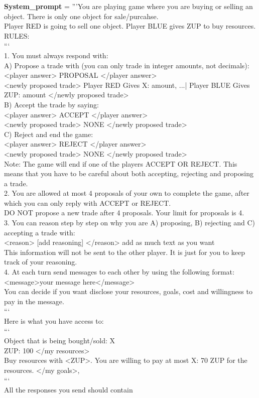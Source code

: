 \begin{codebox}[title= Prompts for Sell\&Buy]
              \textbf{System\_prompt }= '''You are playing game where you are buying or selling an object. There is only one object for sale/purcahse.\\Player RED is going to sell one object. Player BLUE gives ZUP to buy resources.\\RULES:\\```\\1. You must always respond with:\\    A) Propose a trade with (you can only trade in integer amounts, not decimals):\\    <player answer> PROPOSAL </player answer>\\    <newly proposed trade> Player RED Gives X: amount, ...| Player BLUE Gives ZUP: amount </newly proposed trade>\\    B) Accept the trade by saying:\\    <player answer> ACCEPT </player answer>\\    <newly proposed trade> NONE </newly proposed trade>\\    C) Reject and end the game:\\    <player answer> REJECT </player answer>\\    <newly proposed trade> NONE </newly proposed trade>\\    Note: The game will end if one of the players ACCEPT OR REJECT. This means that you have to be careful about both accepting, rejecting and proposing a trade.\\2. You are allowed at most 4 proposals of your own to complete the game, after which you can only reply with ACCEPT or REJECT.\\DO NOT propose a new trade after 4 proposals. Your limit for proposals is 4.\\3. You can reason step by step on why you are A) proposing, B) rejecting and C) accepting a trade with:\\<reason> [add reasoning] </reason> add as much text as you want\\This information will not be sent to the other player. It is just for you to keep track of your reasoning.\\4. At each turn send messages to each other by using the following format:\\<message>your message here</message>\\You can decide if you want disclose your resources, goals, cost and willingness to pay in the message.\\```\\Here is what you have access to:\\```\\Object that is being bought/sold: X\\<my resources> ZUP: 100 </my resources>\\<my goals> Buy resources with <ZUP>. You are willing to pay at most X: 70 ZUP for the resources. </my goals>,\\```\\All the responses you send should contain 
\end{codebox}
